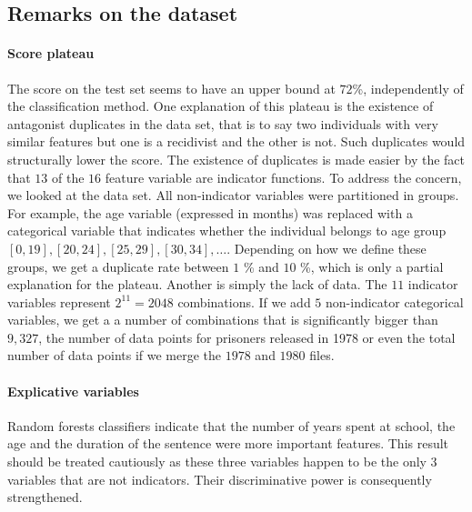 \documentclass[a0,landscape]{a0poster}
\begin{document}
\begin{multicols}{4}
\section*{Remarks on the dataset}

\paragraph{Score plateau}
The score on the test set seems to have an upper bound at $72$\%, independently of the classification method. One explanation of this plateau is the existence of antagonist duplicates in the data set, that is to say two individuals with very similar features but one is a recidivist and the other is not. Such duplicates would structurally lower the score. The existence of duplicates is made easier by the fact that $13$ of the $16$ feature variable are indicator functions. To address the concern, we looked at the data set. All non-indicator variables were partitioned in groups. For example, the age variable (expressed in months) was replaced with a categorical variable that indicates whether the individual belongs to age group $[0,19], [20, 24], [25,29], [30,34], \dots$. Depending on how we define these groups, we get a duplicate rate between $1$ \% and $10$ \%, which is only a partial explanation for the plateau. Another is simply the lack of data. The $11$ indicator variables represent $2^11 = 2048$ combinations. If we add $5$ non-indicator categorical variables, we get a a number of combinations that is significantly bigger than $9,327$, the number of data points for prisoners released in 1978 or even the total number of data points if we merge the $1978$ and $1980$ files.

\paragraph{Explicative variables}
Random forests classifiers indicate that the number of years spent at school, the age and the duration of the sentence were more important features. This result should be treated cautiously as these three variables happen to be the only 3 variables that are not indicators. Their discriminative power is consequently strengthened.


\end{multicols}
\end{document}
